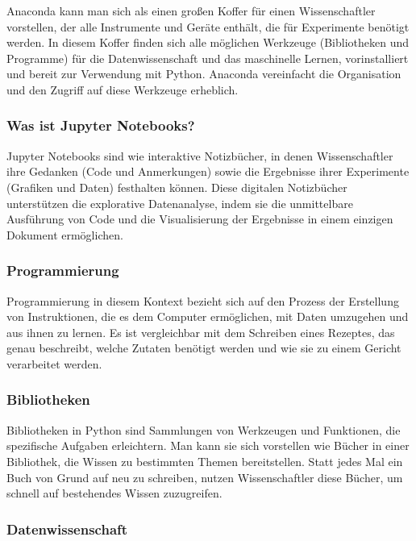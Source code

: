 \documentclass{vorlage-design-main}
\begin{document}
Anaconda kann man sich als einen großen Koffer für einen Wissenschaftler
vorstellen, der alle Instrumente und Geräte enthält, die für Experimente
benötigt werden. In diesem Koffer finden sich alle möglichen Werkzeuge
(Bibliotheken und Programme) für die Datenwissenschaft und das
maschinelle Lernen, vorinstalliert und bereit zur Verwendung mit Python.
Anaconda vereinfacht die Organisation und den Zugriff auf diese
Werkzeuge erheblich.

\subsubsection{Was ist Jupyter
Notebooks?}\label{was-ist-jupyter-notebooks}

Jupyter Notebooks sind wie interaktive Notizbücher, in denen
Wissenschaftler ihre Gedanken (Code und Anmerkungen) sowie die
Ergebnisse ihrer Experimente (Grafiken und Daten) festhalten können.
Diese digitalen Notizbücher unterstützen die explorative Datenanalyse,
indem sie die unmittelbare Ausführung von Code und die Visualisierung
der Ergebnisse in einem einzigen Dokument ermöglichen.

\subsubsection{Programmierung}\label{programmierung}

Programmierung in diesem Kontext bezieht sich auf den Prozess der
Erstellung von Instruktionen, die es dem Computer ermöglichen, mit Daten
umzugehen und aus ihnen zu lernen. Es ist vergleichbar mit dem Schreiben
eines Rezeptes, das genau beschreibt, welche Zutaten benötigt werden und
wie sie zu einem Gericht verarbeitet werden.

\subsubsection{Bibliotheken}\label{bibliotheken}

Bibliotheken in Python sind Sammlungen von Werkzeugen und Funktionen,
die spezifische Aufgaben erleichtern. Man kann sie sich vorstellen wie
Bücher in einer Bibliothek, die Wissen zu bestimmten Themen
bereitstellen. Statt jedes Mal ein Buch von Grund auf neu zu schreiben,
nutzen Wissenschaftler diese Bücher, um schnell auf bestehendes Wissen
zuzugreifen.

\subsubsection{Datenwissenschaft}\label{datenwissenschaft}
\end{document}
